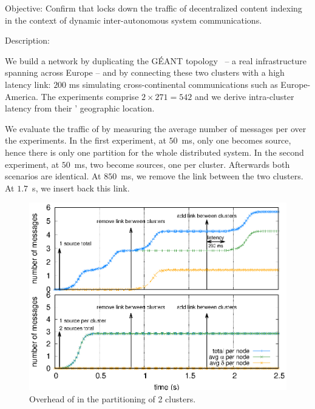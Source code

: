 

\begin{asparadesc}

\item [Objective:] Confirm that \NAME locks down the traffic of decentralized content
  indexing in the context of dynamic inter-autonomous system
  communications.
  
\item [Description:]

We build a network by duplicating the G{\'E}ANT
topology~\cite{knight2011internet} -- a real infrastructure spanning
across Europe -- and by connecting these two clusters with a high
latency link: $200$ ms simulating cross-continental communications
such as Europe-America. The experiments comprise $2 \times 271 = 542$
\processes and we derive intra-cluster latency from their \processes'
geographic location.

\noindent We evaluate the traffic of \NAME by measuring the average
number of messages per \process over the experiments. In the first
experiment, at $50$~ms, only one \process becomes source, hence there
is only one partition for the whole distributed system. In the second
experiment, at $50$~ms, two \processes become sources, one per
cluster. Afterwards both scenarios are identical. At $850$~ms, we
remove the link between the two clusters. At $1.7$~s, we insert back this
link.

\begin{figure}
  \centering\includegraphics[width=0.8\columnwidth]{img/as_cast_geant.eps}
  \caption{\label{fig:geant}Overhead of \NAME in the partitioning of 2 clusters.}
\end{figure}


\end{asparadesc}
